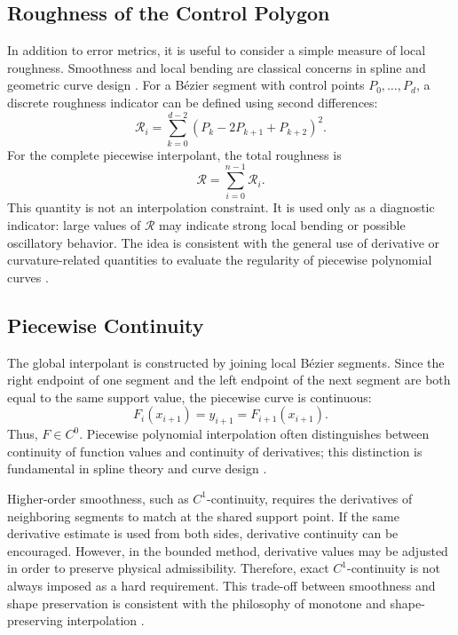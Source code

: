 \documentclass[12pt,a4paper]{article}
\begin{document}
\subsection{Roughness of the Control Polygon}

In addition to error metrics, it is useful to consider a simple measure of local roughness. Smoothness and local bending are classical concerns in spline and geometric curve design \cite{deboor1978splines,farin2002curves}. For a B\'ezier segment with control points \(P_0,\dots,P_d\), a discrete roughness indicator can be defined using second differences:
\[
\mathcal{R}_i=
\sum_{k=0}^{d-2}
\left(P_k-2P_{k+1}+P_{k+2}\right)^2.
\]
For the complete piecewise interpolant, the total roughness is
\[
\mathcal{R}=
\sum_{i=0}^{n-1}\mathcal{R}_i.
\]
This quantity is not an interpolation constraint. It is used only as a diagnostic indicator: large values of \(\mathcal{R}\) may indicate strong local bending or possible oscillatory behavior. The idea is consistent with the general use of derivative or curvature-related quantities to evaluate the regularity of piecewise polynomial curves \cite{deboor1978splines,farin2002curves}.

\subsection{Piecewise Continuity}

The global interpolant is constructed by joining local B\'ezier segments. Since the right endpoint of one segment and the left endpoint of the next segment are both equal to the same support value, the piecewise curve is continuous:
\[
F_i(x_{i+1})=y_{i+1}=F_{i+1}(x_{i+1}).
\]
Thus, \(F\in C^0\). Piecewise polynomial interpolation often distinguishes between continuity of function values and continuity of derivatives; this distinction is fundamental in spline theory and curve design \cite{deboor1978splines,farin2002curves}.

Higher-order smoothness, such as \(C^1\)-continuity, requires the derivatives of neighboring segments to match at the shared support point. If the same derivative estimate is used from both sides, derivative continuity can be encouraged. However, in the bounded method, derivative values may be adjusted in order to preserve physical admissibility. Therefore, exact \(C^1\)-continuity is not always imposed as a hard requirement. This trade-off between smoothness and shape preservation is consistent with the philosophy of monotone and shape-preserving interpolation \cite{fritsch1980monotone,fritsch1984monotone}.
\end{document}
